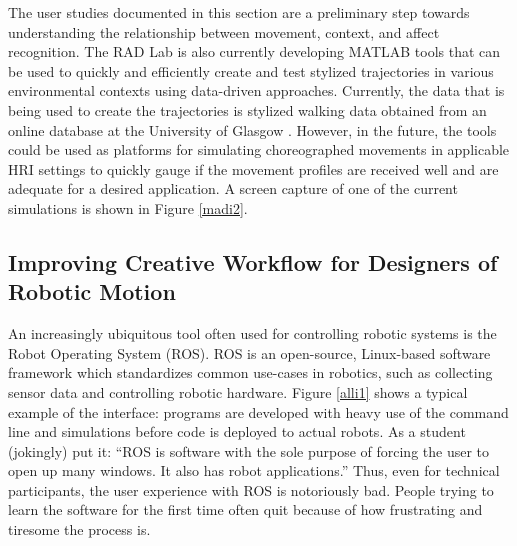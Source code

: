 \documentclass[arts,article,submit,moreauthors,pdftex,10pt,a4paper]{mdpi}
\begin{document}

The user studies documented in this section are a preliminary step towards understanding the relationship between movement, context, and affect recognition. The RAD Lab is also currently developing MATLAB tools that can be used to quickly and efficiently create and test stylized trajectories in various environmental contexts using data-driven approaches. Currently, the data that is being used to create the trajectories is stylized walking data obtained from an online database at the University of Glasgow \cite{ma2006motion}. However, in the future, the tools could be used as platforms for simulating choreographed movements in applicable HRI settings to quickly gauge if the movement profiles are received well and are adequate for a desired application. A screen capture of one of the current simulations is shown in Figure \ref{madi2}.

\subsection{Improving Creative Workflow for Designers of Robotic Motion}\label{alli_sec}



An increasingly ubiquitous tool often used for controlling robotic systems is
the Robot Operating System (ROS). ROS is an open-source, Linux-based software framework which
standardizes common use-cases in robotics, such as collecting sensor data and controlling
robotic hardware. Figure \ref{alli1} shows a typical example of the interface:
programs are developed with heavy use of the command line and simulations before
code is deployed to actual robots. As a student (jokingly) put it: ``ROS is software with the sole purpose of
forcing the user to open up many windows. It also has robot applications.''
Thus, even for technical participants, the user experience with ROS is
notoriously bad. People trying to learn the software for the first time often
quit because of how frustrating and tiresome the process is.
\end{document}
